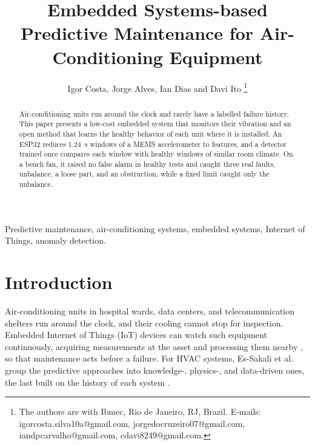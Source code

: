 \documentclass[english,hidelinks]{sbrt}
\begin{document}
\title{Embedded Systems-based Predictive Maintenance for Air-Conditioning Equipment}

\author{Igor Costa, Jorge Alves, Ian Dias and Davi Ito
  \thanks{The authors are with Ibmec, Rio de Janeiro, RJ, Brazil.
  E-mails: igorcosta.silva10a@gmail.com,
  jorgedocruzeiro07@gmail.com,
  iandpcarvalho@gmail.com,
  cdavi8249@gmail.com.}%
  }

\maketitle


\begin{abstract}
Air-conditioning units run around the clock and rarely have a labelled failure history. This paper presents a low-cost embedded system that monitors their vibration and an open method that learns the healthy behavior of each unit where it is installed. An ESP32 reduces 1.24~s windows of a MEMS accelerometer to features, and a detector trained once compares each window with healthy windows of similar room climate. On a bench fan, it raised no false alarm in healthy tests and caught three real faults, unbalance, a loose part, and an obstruction, while a fixed limit caught only the unbalance.
\end{abstract}
\begin{keywords}
Predictive maintenance, air-conditioning systems, embedded systems, Internet of Things, anomaly detection.
\end{keywords}

\section{Introduction}

Air-conditioning units in hospital wards, data centers, and telecommunication shelters run around the clock, and their cooling cannot stop for inspection. Embedded Internet of Things (IoT) devices can watch such equipment continuously, acquiring measurements at the asset and processing them nearby \cite{gubbi2013iot}, so that maintenance acts before a failure. For HVAC systems, Es-Sakali et al. group the predictive approaches into knowledge-, physics-, and data-driven ones, the last built on the history of each system \cite{essakali2022hvac}.
\end{document}
